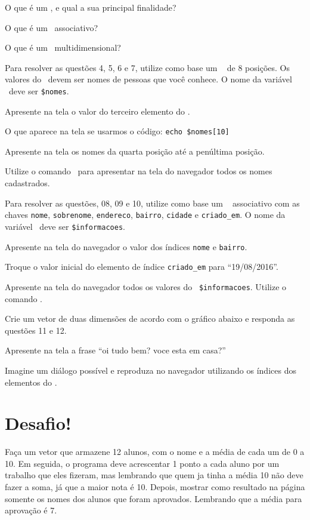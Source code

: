 \begin{description}[labelindent=30pt]
  \item [Q. 01] O que é um \tipoarray, e qual a sua principal finalidade?
  \item [Q. 02] O que é um \tipoarray~associativo?
  \item [Q. 03] O que é um \tipoarray~multidimensional?
  \item Para resolver as questões 4, 5, 6 e 7, utilize como base um \tipoarray~
  de 8 posições. Os valores do \tipoarray~devem ser nomes de pessoas que você conhece. 
  O nome da variável \tipoarray~deve ser \texttt{\$nomes}.
  \item [Q. 04] Apresente na tela o valor do terceiro elemento do \tipoarray.
  \item [Q. 05] O que aparece na tela se usarmos o código: \texttt{echo \$nomes[10]}
  \item [Q. 06] Apresente na tela os nomes da quarta posição até a penúltima posição.
  \item [Q. 07] Utilize o comando \comandoforeach~para apresentar na tela do navegador
  todos os nomes cadastrados.
  \item Para resolver as questões, 08, 09 e 10, utilize como base um \tipoarray~ associativo
  com as chaves \texttt{nome}, \texttt{sobrenome}, \texttt{endereco}, \texttt{bairro},
  \texttt{cidade} e \texttt{criado\_em}. O nome da variável \tipoarray~deve ser \texttt{\$informacoes}.
  \item [Q. 08] Apresente na tela do navegador o valor dos índices \texttt{nome} e \texttt{bairro}.
  \item [Q. 09] Troque o valor inicial do elemento de índice \texttt{criado\_em} para ``19/08/2016''.
  \item [Q. 10] Apresente na tela do navegador todos os valores do \tipoarray~\texttt{\$informacoes}.
  Utilize o comando \comandoforeach.
  \item Crie um vetor de duas dimensões de acordo com o gráfico abaixo e responda as questões 11 e 12.
  
  \item [Q. 11] Apresente na tela a frase ``oi tudo bem? voce esta em casa?'' 
  \item [Q. 12] Imagine um diálogo possível e reproduza no navegador utilizando os índices dos
  elementos do \tipoarray.
\end{description}

\section{Desafio!}
\label{cap6-desafio}

Faça um vetor que armazene 12 alunos, com o nome e a média de cada um de 0 a 10. Em seguida, o programa 
deve acrescentar 1 ponto a cada aluno por um trabalho que eles fizeram, mas lembrando que quem ja tinha 
a média 10 não deve fazer a soma, já que a maior nota é 10. Depois, mostrar como resultado na página 
somente os nomes dos alunos que foram aprovados. Lembrando que a média para aprovação é 7.  